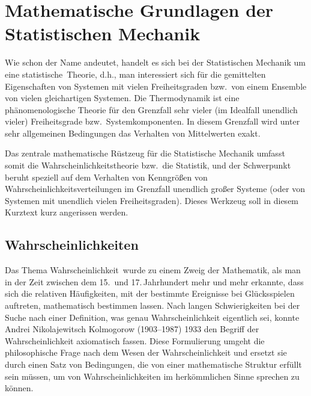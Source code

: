 
\chapter{Mathematische Grundlagen der Statistischen Mechanik}
\label{chap_MathStat}

%
Wie schon der Name andeutet, handelt es sich bei
der Statistischen Mechanik um eine \glqq statistische\grqq\
Theorie, d.h., man interessiert sich f\"ur die
gemittelten Eigenschaften von Systemen
mit vielen Freiheitsgraden bzw.\ von einem
Ensemble von vielen gleichartigen Systemen. 
Die Thermodynamik ist eine ph\"anomenologische
Theorie f\"ur den Grenzfall sehr vieler (im Idealfall
unendlich vieler) Freiheitsgrade bzw.\ 
Systemkomponenten. In diesem Grenzfall wird
unter sehr allgemeinen Bedingungen das
Verhalten von Mittelwerten exakt. 

Das zentrale mathematische R\"ustzeug f\"ur
die Statistische Mechanik umfasst somit die
Wahrscheinlichkeitstheorie bzw.\ die Statistik, und der
Schwerpunkt beruht 
speziell auf dem Verhalten von Kenngr\"o\ss en von
Wahrscheinlichkeitsverteilungen im Grenzfall
unendlich gro\ss er Systeme (oder von Systemen
mit unendlich vielen Freiheitsgraden). Dieses
Werkzeug soll in diesem Kurztext kurz angerissen 
werden. 

\section{Wahrscheinlichkeiten}

Das Thema \glqq Wahrscheinlichkeit\grqq\ wurde zu
einem Zweig der Mathematik, als man in der Zeit
zwischen dem 15.\ und 17.\,Jahrhundert 
mehr und mehr erkannte, dass sich die relativen
H\"aufigkeiten, mit der bestimmte Ereignisse bei
Gl\"ucksspielen auftreten, mathematisch bestimmen
lassen. Nach langen Schwierigkeiten bei der Suche
nach einer Definition, was genau Wahrscheinlichkeit
eigentlich sei, konnte Andrei Nikolajewitsch Kolmogorow (1903--1987) 1933
den Begriff der Wahrscheinlichkeit axiomatisch
fassen. Diese Formulierung umgeht die philosophische
Frage nach dem Wesen der Wahrscheinlichkeit und
ersetzt sie durch einen Satz von Bedingungen,
die von einer mathematische Struktur erf\"ullt sein
m\"ussen, um von Wahrscheinlichkeiten im 
herk\"ommlichen Sinne sprechen zu k\"onnen.

